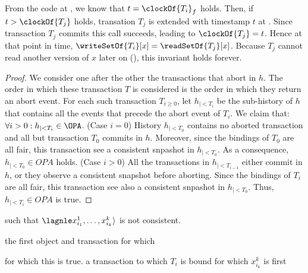     From the code at , we know that $t=\clockOf{T_i}_f$ holds.
    Then, if $t > \clockOf{T_j}$ holds, transation $T_j$ is extended with timestamp $t$ at .
    Since transaction $T_j$ commits this call succeeds, leading to $\clockOf{T_j} = t$.
    Hence at that point in time, $\writeSetOf{T_i}[x] = \readSetOf{T_j}[x]$.
    Because $T_j$ cannot read another version of $x$ later on (), this invariant holds forever.


    \begin{proof}
  We consider one after the other the transactions that abort in $h$.
  The order in which these transaction $T$ is considered is the order in which they return an abort event.
  For each such transaction $T_{i \geq 0}$, let $h_{|<T_i}$ be the sub-history of $h$ that contains all the events that precede the abort event of $T_i$.
  We claim that: $\forall i > 0 : h_{|<T_i} \in \OPA$.
  (Case $i=0$)
  History $h_{|<T_0}$ contains no aborted transaction and all but transaction $T_0$ commits in $h$.
  Moreover, since the bindings of $T_0$ are all fair, this transaction see a consistent snpashot in $h_{|<T_0}$.
  As a consequence, $h_{|<T_0} \in OPA$ holds.
  (Case $i>0$)
  All the transactions in $h_{|<T_{i-1}}$ either commit in $h$, or they observe a consistent snapshot before aborting.
  Since the bindings of $T_i$ are all fair, this transaction see also a consistent snpashot in $h_{|<T_0}$.
  Thus, $h_{|<T_i} \in OPA$ is true.  
\end{proof}


      such that $\lagnle x^1_{i_1}, \ldots, x^k_{i_k} \rangle$ is not consistent.
  
  the first object and transaction for which 

  for which this is true.
  a transaction to which $T_i$ is bound for which $x^k_{i_k}$ is first 
